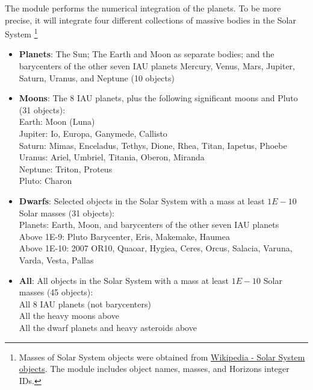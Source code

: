 The module  performs the numerical integration of the planets.
To be more precise, it will integrate four different collections of massive bodies in the Solar System
\footnote{Masses of Solar System objects were obtained from \href{https://en.wikipedia.org/wiki/List_of_Solar_System_objects_by_size}{Wikipedia - Solar System objects}.
The module  includes object names, masses, and Horizons integer IDs.}
\begin{itemize}
\item \textbf{Planets}: The Sun; The Earth and Moon as separate bodies; and the barycenters of the other seven IAU planets 
Mercury, Venus, Mars, Jupiter, Saturn, Uranus, and Neptune (10 objects)
\item \textbf{Moons}: The 8 IAU planets, plus the following significant moons and Pluto (31 objects): \\
Earth: Moon (Luna)\\
Jupiter: Io, Europa, Ganymede, Callisto \\
Saturn: Mimas, Enceladus, Tethys, Dione, Rhea, Titan, Iapetus, Phoebe \\
Uranus: Ariel, Umbriel, Titania, Oberon, Miranda \\
Neptune: Triton, Proteus \\
Pluto: Charon 
\item \textbf{Dwarfs}: Selected objects in the Solar System with a mass at least $1E-10$ Solar masses (31 objects): \\
Planets: Earth, Moon, and barycenters of the other seven IAU planets \\
Above 1E-9: Pluto Barycenter, Eris, Makemake, Haumea \\
Above 1E-10: 2007 OR10, Quaoar, Hygiea, Ceres, Orcus, Salacia, Varuna, Varda, Vesta, Pallas
\item \textbf{All}: All objects in the Solar System with a mass at least $1E-10$ Solar masses (45 objects): \\
All 8 IAU planets (not barycenters) \\
All the heavy moons above \\
All the dwarf planets and heavy asteroids above
\end{itemize}

